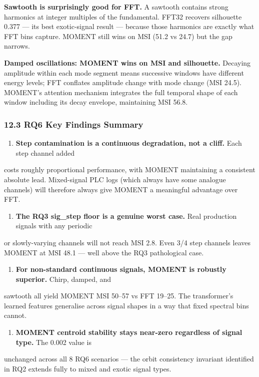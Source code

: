 \documentclass[11pt,a4paper]{article}
\begin{document}
\textbf{Sawtooth is surprisingly good for FFT.} A sawtooth contains strong harmonics at integer
multiples of the fundamental. FFT32 recovers silhouette 0.377 --- its best exotic-signal result ---
because those harmonics are exactly what FFT bins capture. MOMENT still wins on MSI (51.2 vs
24.7) but the gap narrows.

\textbf{Damped oscillations: MOMENT wins on MSI and silhouette.} Decaying amplitude within each mode
segment means successive windows have different energy levels; FFT conflates amplitude change with
mode change (MSI 24.5). MOMENT's attention mechanism integrates the full temporal shape of each
window including its decay envelope, maintaining MSI 56.8.

\subsubsection{12.3 RQ6 Key Findings Summary}

\begin{enumerate}
  \item \textbf{Step contamination is a continuous degradation, not a cliff.} Each step channel added
\end{enumerate}
   costs roughly proportional performance, with MOMENT maintaining a consistent absolute lead.
   Mixed-signal PLC logs (which always have some analogue channels) will therefore always give
   MOMENT a meaningful advantage over FFT.

\begin{enumerate}
  \item \textbf{The RQ3 sig\_step floor is a genuine worst case.} Real production signals with any periodic
\end{enumerate}
   or slowly-varying channels will not reach MSI 2.8. Even 3/4 step channels leaves MOMENT at MSI
   48.1 --- well above the RQ3 pathological case.

\begin{enumerate}
  \item \textbf{For non-standard continuous signals, MOMENT is robustly superior.} Chirp, damped, and
\end{enumerate}
   sawtooth all yield MOMENT MSI 50--57 vs FFT 19--25. The transformer's learned features
   generalise across signal shapes in a way that fixed spectral bins cannot.

\begin{enumerate}
  \item \textbf{MOMENT centroid stability stays near-zero regardless of signal type.} The 0.002 value is
\end{enumerate}
   unchanged across all 8 RQ6 scenarios --- the orbit consistency invariant identified in RQ2
   extends fully to mixed and exotic signal types.
\end{document}
